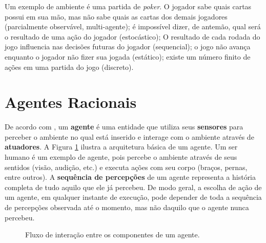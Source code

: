 Um exemplo de ambiente é uma partida de \textit{poker}. O jogador sabe quais
cartas possui em sua mão, mas não sabe quais as cartas dos demais jogadores
(parcialmente observável, multi-agente); é impossível dizer, de antemão, qual
será o resultado de uma ação do jogador (estocástico); O resultado de cada
rodada do jogo influencia nas decisões futuras do jogador (sequencial); o jogo
não avança enquanto o jogador não fizer sua jogada (estático); existe um número
finito de ações em uma partida do jogo (discreto).


\section{\label{section:agents}Agentes Racionais}
De acordo com \cite{RussellNorvig200912}, um \textbf{agente} é uma entidade que
utiliza seus \textbf{sensores} para perceber o ambiente no qual está inserido e
interage com o ambiente através de \textbf{atuadores}. A Figura
\ref{fig:agent-interaction} ilustra a arquitetura básica de um agente. Um ser
humano é um exemplo de agente, pois percebe o ambiente através de seus sentidos
(visão, audição, etc.) e executa ações com seu corpo (braços, pernas, entre
outros). A \textbf{sequência de percepções} de um agente representa a história
completa de tudo aquilo que ele já percebeu. De modo geral, a escolha de ação de
um agente, em qualquer instante de execução, pode depender de toda a sequência
de percepções observada até o momento, mas não daquilo que o agente nunca
percebeu.

\begin{figure}[h]
\centering
{}
\caption{Fluxo de interação entre os componentes de um agente.}
\label{fig:agent-interaction}
\end{figure}


